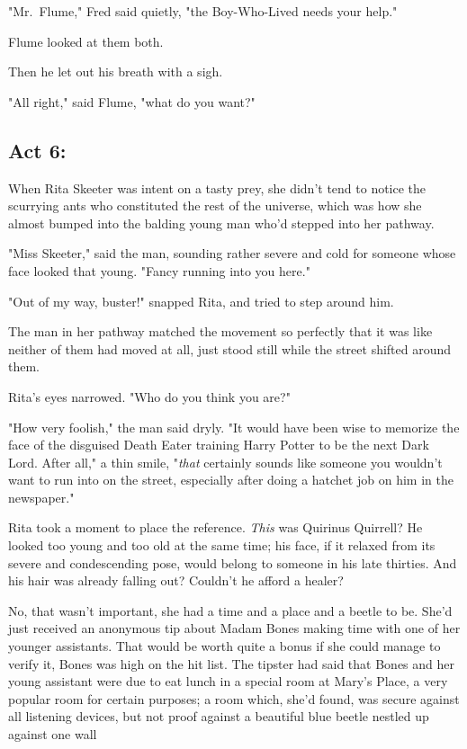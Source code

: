 "Mr.~Flume," Fred said quietly, "the Boy-Who-Lived needs your help."

Flume looked at them both.

Then he let out his breath with a sigh.

"All right," said Flume, "what do you want?"
\sbreak
\subsection{Act 6:}

When Rita Skeeter was intent on a tasty prey, she didn't tend to notice the
scurrying ants who constituted the rest of the universe, which was how she
almost bumped into the balding young man who'd stepped into her pathway.

"Miss Skeeter," said the man, sounding rather severe and cold for someone whose
face looked that young. "Fancy running into you here."

"Out of my way, buster!" snapped Rita, and tried to step around him.

The man in her pathway matched the movement so perfectly that it was like
neither of them had moved at all, just stood still while the street shifted
around them.

Rita's eyes narrowed. "Who do you think you are?"

"How very foolish," the man said dryly. "It would have been wise to memorize
the face of the disguised Death Eater training Harry Potter to be the next Dark
Lord. After all," a thin smile, "\emph{that} certainly sounds like someone you
wouldn't want to run into on the street, especially after doing a hatchet job
on him in the newspaper."

Rita took a moment to place the reference. \emph{This} was Quirinus Quirrell?
He looked too young and too old at the same time; his face, if it relaxed from
its severe and condescending pose, would belong to someone in his late
thirties. And his hair was already falling out? Couldn't he afford a healer?

No, that wasn't important, she had a time and a place and a beetle to be. She'd
just received an anonymous tip about Madam Bones making time with one of her
younger assistants. That would be worth quite a bonus if she could manage to
verify it, Bones was high on the hit list. The tipster had said that Bones and
her young assistant were due to eat lunch in a special room at Mary's Place, a
very popular room for certain purposes; a room which, she'd found, was secure
against all listening devices, but not proof against a beautiful blue beetle
nestled up against one wall{\el}


